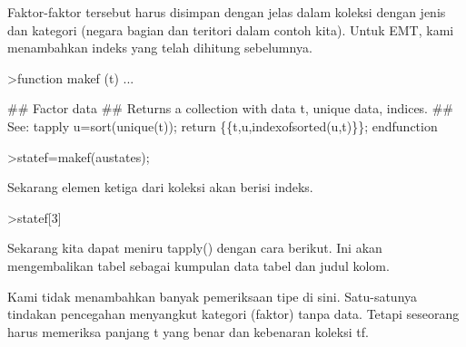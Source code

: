 \documentclass[a4paper,10pt]{article}
\begin{document}
\begin{eulernotebook}
\begin{eulercomment}
\begin{eulercomment}
\begin{eulercomment}
\begin{eulercomment}
\begin{eulercomment}
Faktor-faktor tersebut harus disimpan dengan jelas dalam koleksi
dengan jenis dan kategori (negara bagian dan teritori dalam contoh
kita). Untuk EMT, kami menambahkan indeks yang telah dihitung
sebelumnya.
\end{eulercomment}
\begin{eulerprompt}
>function makef (t) ...
\end{eulerprompt}
\begin{eulerudf}
  ## Factor data
  ## Returns a collection with data t, unique data, indices.
  ## See: tapply
  u=sort(unique(t));
  return \{\{t,u,indexofsorted(u,t)\}\};
  endfunction
\end{eulerudf}
\begin{eulerprompt}
>statef=makef(austates);
\end{eulerprompt}
\begin{eulercomment}
Sekarang elemen ketiga dari koleksi akan berisi indeks.
\end{eulercomment}
\begin{eulerprompt}
>statef[3]
\end{eulerprompt}
\begin{euleroutput}
  [6,  5,  4,  2,  2,  3,  8,  8,  4,  7,  2,  7,  4,  4,  5,  6,  5,  3,
  8,  7,  4,  2,  2,  8,  5,  1,  2,  7,  7,  1]
\end{euleroutput}
\begin{eulercomment}
Sekarang kita dapat meniru tapply() dengan cara berikut. Ini akan
mengembalikan tabel sebagai kumpulan data tabel dan judul kolom.
\end{eulercomment}
\begin{eulercomment}
Kami tidak menambahkan banyak pemeriksaan tipe di sini. Satu-satunya
tindakan pencegahan menyangkut kategori (faktor) tanpa data. Tetapi
seseorang harus memeriksa panjang t yang benar dan kebenaran koleksi
tf.


\end{eulercomment}
\end{eulercomment}
\end{eulercomment}
\end{eulercomment}
\end{eulercomment}
\end{eulernotebook}
\end{document}
